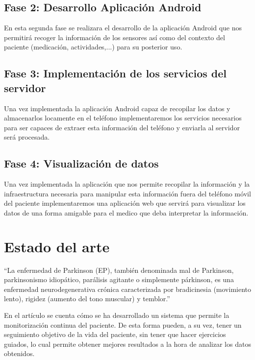 \documentclass[11pt,spanish]{article}
\begin{document}
\subsection{Fase 2: Desarrollo Aplicación Android}
En esta segunda fase se realizara el desarrollo de la aplicación Android que nos permitirá recoger la información de los sensores así como del contexto del paciente (medicación, actividades,...) para su posterior uso.

\subsection{Fase 3: Implementación de los servicios del servidor}
Una vez implementada la aplicación Android capaz de recopilar los datos y almacenarlos locamente en el teléfono implementaremos los servicios necesarios para ser capaces de extraer esta información del teléfono y enviarla al servidor será procesada.

\subsection{Fase 4: Visualización de datos}
Una vez implementada la aplicación que nos permite recopilar la información y la infraestructura necesaria para manipular esta información fuera del teléfono móvil del paciente implementaremos una aplicación web que servirá para visualizar los datos de una forma amigable para el medico que deba interpretar la información.

\newpage

\section{Estado del arte}
“La enfermedad de Parkinson (EP), también denominada mal de Parkinson, parkinsonismo idiopático, parálisis agitante o simplemente párkinson, es una enfermedad neurodegenerativa crónica caracterizada por bradicinesia (movimiento lento), rigidez (aumento del tono muscular) y temblor.” \cite{Wikipedia} 
\newline

En el artículo \cite{resumen1} se cuenta cómo se ha desarrollado un sistema que permite la monitorización continua del paciente. De esta forma pueden, a su vez, tener un seguimiento objetivo de la vida del paciente, sin tener que hacer ejercicios guiados, lo cual permite obtener mejores resultados a la hora de analizar los datos obtenidos. 
\newline
\end{document}
